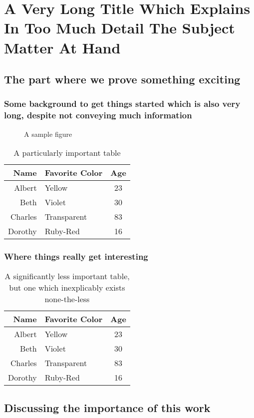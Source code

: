 \chapter{A Very Long Title Which Explains In Too Much Detail The Subject Matter At Hand}

\section{The part where we prove something exciting}

\blindtext

\subsection{Some background to get things started which is also very long, despite not conveying much information}

\blindtext

\begin{figure}
	\centering
	\emptybox{3.5in}{2in}
	\caption{A sample figure}
\end{figure}

\blindtext[2]

\begin{table}
	\centering
	\begin{tabular}{r|lc}
		Name    & Favorite Color & Age \\ \hline
		Albert  & Yellow         & 23 \\
		Beth    & Violet         & 30 \\
		Charles & Transparent    & 83 \\
		Dorothy & Ruby-Red       & 16
	\end{tabular}
	\caption{A particularly important table}
\end{table}

\subsection{Where things really get interesting}

\blindtext

\begin{table}
	\centering
	\begin{tabular}{r|lc}
		Name    & Favorite Color & Age \\ \hline
		Albert  & Yellow         & 23 \\
		Beth    & Violet         & 30 \\
		Charles & Transparent    & 83 \\
		Dorothy & Ruby-Red       & 16
	\end{tabular}
	\caption{A significantly less important table, but one which inexplicably exists none-the-less}
\end{table}

\blindtext

\section{Discussing the importance of this work}

\blindtext[2]
